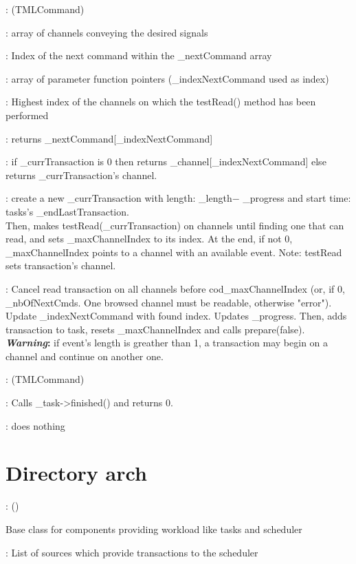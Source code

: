 \documentclass[a4paper,11pt]{article}
\newcommand{\bfont}{\fontseries{b}\selectfont}
\newcommand{\cod}[1]{{\ttfamily #1}}
\newcommand{\class}[2]{\par\vspace{1mm}\hspace{-5mm}\large\colorbox{file}{\textbullet\bfont\cod{#1}:} (\cod{#2})\par}
\newcommand{\method}[1]{\par\vspace{1mm}\hspace{-2mm}\colorbox{method}{\textopenbullet\bfont\cod{#1}:}}
\newcommand{\variable}[1]{\par\vspace{1mm}\hspace{-2mm}\colorbox{variable}{\textopenbullet\bfont\cod{#1}:}}
\begin{document}
\class{TMLSelectCommand}{TMLCommand}
\variable{\_channel} array of channels conveying the desired signals
\variable{\_indexNextCommand} Index of the next command within the \cod{\_nextCommand} array
\variable{\_paramFuncs} array of parameter function pointers (\cod{\_indexNextCommand} used as index)
\variable{\_maxChannelIndex} Highest index of the channels on which the \cod{testRead()} method has been performed

\method{getNextCommand()} returns \cod{\_nextCommand[\_indexNextCommand]}
\method{getChannel(iIndex)}  if \cod{\_currTransaction} is 0 then returns \cod{\_channel[\_indexNext\-Command]} else returns \cod{\_currTransaction}'s channel.
\method{prepareNextTransaction()} create a new \cod{\_currTransaction} with length: \cod{\_length}$-$ \cod{\_progress} and start time: tasks's \cod{\_endLastTransaction}.\\ Then, makes \cod{testRead(\_currTransaction}) on channels until finding one that can read, and sets \cod{\_maxChannelIndex} to its index. At the end, if not 0, \cod{\_maxChannelIndex} points to a channel with an available event. Note: \cod{testRead} sets transaction's channel.
\method{execute()} Cancel read transaction on all channels before cod{\_maxChannelIndex} (or, if 0, \cod{\_nbOfNextCmds}. One browsed channel must be readable, otherwise "error"). Update \cod{\_indexNextCommand} with found index. Updates \cod{\_progress}. Then, adds transaction to task, resets \cod{\_maxChannelIndex} and calls \cod{prepare(false)}. {\bf\textit{Warning}:} if event's length is greather than 1, a transaction may begin on a channel and continue on another one.
\class{TMLStopCommand}{TMLCommand}
\method{prepareNextTransaction()} Calls \cod{\_task->finished()} and returns 0.
\method{execute()} does nothing

\section*{Directory \cod{arch}}
	
\class{WorkloadSource}{}
Base class for components providing workload like tasks and scheduler
\variable{workloadList} List of sources which provide transactions to the scheduler
\end{document}
